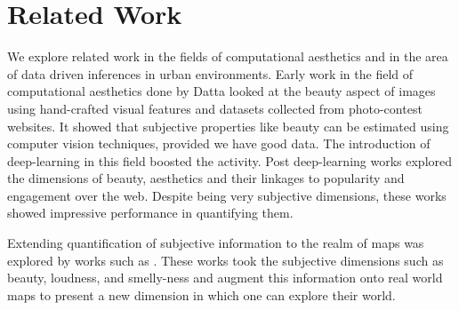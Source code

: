 \section{Related Work}
We explore related work in the fields of computational aesthetics and in the area of data driven inferences in urban environments. 
Early work in the field of computational aesthetics done by Datta \cite{datta2008algorithmic} looked at the beauty aspect of images using hand-crafted visual features and datasets collected from photo-contest websites. It showed that subjective properties like beauty can be estimated using computer vision techniques, provided we have good data.  The introduction of deep-learning in this field boosted the activity. Post deep-learning works \cite{khosla2014makes,Wang:2015:USA:2832415.2832579,schifanella2015image} explored the dimensions of beauty, aesthetics and their linkages to popularity and engagement over the web. Despite being very subjective dimensions, these works showed impressive performance in quantifying them. 
\par
Extending quantification of subjective information to the realm of maps was explored by works such as \cite{quercia2014shortest,quercia2015chatty,quercia2015smelly,aiello2016chatty}. These works took the subjective dimensions such as beauty, loudness, and smelly-ness and augment this information onto real world maps to present a new dimension in which one can explore their world.
